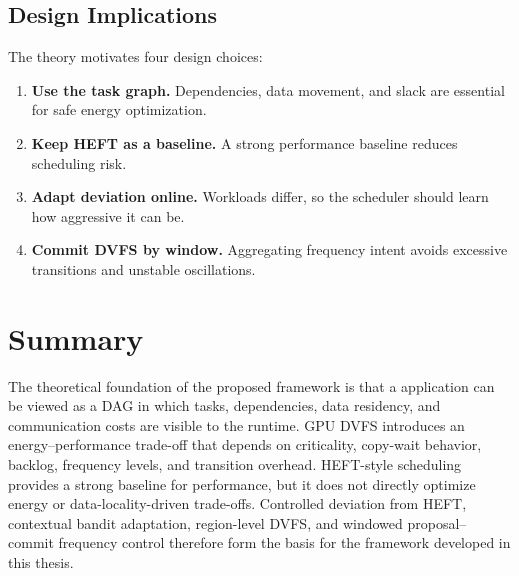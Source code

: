 \subsection{Design Implications}
\label{subsec:design_implications}

The theory motivates four design choices:
\begin{enumerate}
    \item \textbf{Use the task graph.} Dependencies, data movement, and slack are essential for safe energy optimization.
    \item \textbf{Keep HEFT as a baseline.} A strong performance baseline reduces scheduling risk.
    \item \textbf{Adapt deviation online.} Workloads differ, so the scheduler should learn how aggressive it can be.
    \item \textbf{Commit DVFS by window.} Aggregating frequency intent avoids excessive transitions and unstable oscillations.
\end{enumerate}

\section{Summary}
\label{sec:theory_summary}

The theoretical foundation of the proposed framework is that a \CUDASTF{} application can be viewed as a DAG in which tasks, dependencies, data residency, and communication costs are visible to the runtime. GPU DVFS introduces an energy--performance trade-off that depends on criticality, copy-wait behavior, backlog, frequency levels, and transition overhead. HEFT-style scheduling provides a strong baseline for performance, but it does not directly optimize energy or data-locality-driven trade-offs. Controlled deviation from HEFT, contextual bandit adaptation, region-level DVFS, and windowed proposal--commit frequency control therefore form the basis for the framework developed in this thesis.

